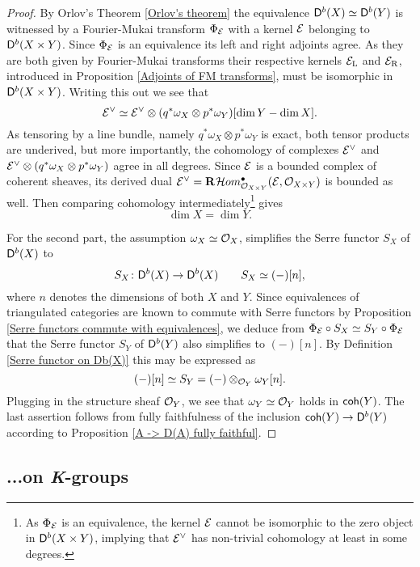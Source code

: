 \begin{proof}
    By Orlov's Theorem \ref{Orlov's theorem} the equivalence $\mathsf{D}^b(X) \simeq \mathsf{D}^b(Y)$ is witnessed by a Fourier-Mukai transform $\Phi_{\mathcal E}$ with a kernel $\mathcal E$ belonging to $\mathsf{D}^b(X \times Y)$. Since $\Phi_{\mathcal E}$ is an equivalence its left and right adjoints agree. As they are both given by Fourier-Mukai transforms their respective kernels $\mathcal E_\mathrm{L}$ and $\mathcal E_\mathrm{R}$, introduced in Proposition \ref{Adjoints of FM transforms}, must be isomorphic in $\mathsf{D}^b(X \times Y)$. Writing this out we see that
    \[
        \mathcal E^\vee \simeq \mathcal E^\vee \otimes (q^*\omega_X \otimes p^*\omega_Y)[\dim Y - \dim X].
    \]
    As tensoring by a line bundle, namely $q^*\omega_X \otimes p^*\omega_Y$ is exact, both tensor products are underived, but more importantly, the cohomology of complexes $\mathcal E^\vee$ and ${\mathcal E^\vee \otimes (q^*\omega_X \otimes p^*\omega_Y)}$ agree in all degrees. Since $\mathcal E$ is a bounded complex of coherent sheaves, its derived dual $\E^\vee = \rderived{}{\localhom[X \times Y]^\bullet(\E, \struct{X \times Y})}$ is bounded as well. Then comparing cohomology intermediately\footnote{As $\Phi_{\mathcal E}$ is an equivalence, the kernel $\mathcal E$ cannot be isomorphic to the zero object in $\mathsf{D}^b(X \times Y)$, implying that $\mathcal E^\vee$ has non-trivial cohomology at least in some degrees.} gives 
    \[
        \dim X = \dim Y.
    \]
    
    For the second part, the assumption $\omega_X \simeq {\mathcal{O}_{X}}$, simplifies the Serre functor $S_X$ of $\mathsf{D}^b(X)$ to 
    \[
        S_X \colon \mathsf{D}^b(X) \to \mathsf{D}^b(X) \qquad S_X \simeq (-)[n], 
    \]
    where $n$ denotes the dimensions of both $X$ and $Y$. Since equivalences of triangulated categories are known to commute with Serre functors by Proposition \ref{Serre functors commute with equivalences}, we deduce from $\Phi_{\mathcal E} \circ S_X \simeq S_Y \circ \Phi_{\mathcal E}$ that the Serre functor $S_Y$ of $\mathsf{D}^b(Y)$ also simplifies to $(-)[n]$. By Definition \ref{Serre functor on Db(X)} this may be expressed as
    \[
        (-)[n] \simeq S_Y = (-) \otimes_{{\mathcal{O}_{Y}}} \omega_Y[n].
    \]
    Plugging in the structure sheaf ${\mathcal{O}_{Y}}$, we see that $\omega_Y \simeq {\mathcal{O}_{Y}}$ holds in $\mathsf{coh}(Y)$. The last assertion 
    follows from fully faithfulness of the inclusion $\mathsf{coh}(Y) \to \mathsf{D}^b(Y)$ according to Proposition \ref{A -> D(A) fully faithful}. 
\end{proof}

\subsection{...on \emph{K}-groups}
\label{Subsection: FM transform on K-theory}

